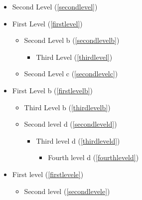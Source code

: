 
\def\mytitle{Table of Contents}


\begin{itemize}

\item Second Level (\autoref{secondlevel})

\item First Level (\autoref{firstlevel})

\begin{itemize}

\item Second Level b (\autoref{secondlevelb})

\begin{itemize}

\item Third Level (\autoref{thirdlevel})

\end{itemize}

\item Second Level c (\autoref{secondlevelc})

\end{itemize}

\item First Level b (\autoref{firstlevelb})

\begin{itemize}

\item Third Level b (\autoref{thirdlevelb})

\item Second level d (\autoref{secondleveld})

\begin{itemize}

\item Third level d (\autoref{thirdleveld})

\begin{itemize}

\item Fourth level d (\autoref{fourthleveld})

\end{itemize}

\end{itemize}

\end{itemize}

\item First level  (\autoref{firstlevele})

\begin{itemize}

\item Second level  (\autoref{secondlevele})

\end{itemize}

\end{itemize}



